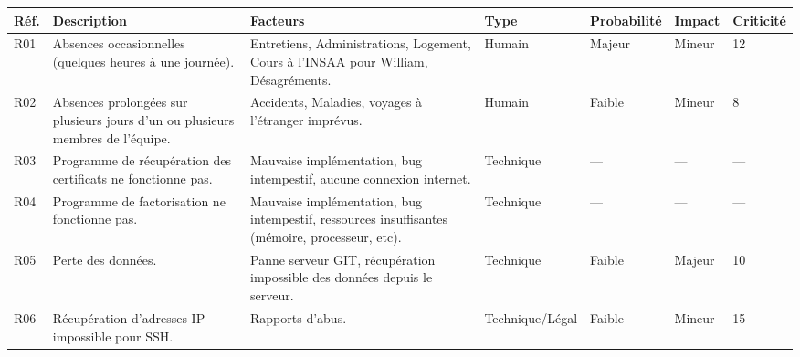 \documentclass[a4paper,11pt,french]{article}
\begin{document}
\begin{center}
\begin{tabular}{|l|p{4cm}|p{4cm}|l|l|l|l|}
\hline
\textbf{Réf.} & \textbf{Description} & \textbf{Facteurs} & \textbf{Type} & \textbf{Probabilité} & \textbf{Impact} & \textbf{Criticité} \\
\hline
 \hline
 R01 & Absences occasionnelles (quelques heures à une journée). &
 Entretiens, Administrations, Logement, Cours à l'INSAA pour William, Désagréments. &
 Humain &
 Majeur &
 Mineur &
 12 \\
 \hline
 R02 & Absences prolongées sur plusieurs jours d'un ou plusieurs membres de l'équipe. &
 Accidents, Maladies, voyages à l'étranger imprévus. &
 Humain &
 Faible &
 Mineur &
 8 \\
 \hline
 R03 & Programme de récupération des certificats ne fonctionne pas. &
 Mauvaise implémentation, bug intempestif, aucune connexion internet. &
 Technique &
 --- &
 --- &
 --- \\
\hline
 R04 & Programme de factorisation ne fonctionne pas. &
 Mauvaise implémentation, bug intempestif, ressources insuffisantes (mémoire, processeur, etc). &
 Technique &
 --- &
 --- &
 --- \\
\hline
 R05 & Perte des données. &
 Panne serveur GIT, récupération impossible des données depuis le serveur. &
 Technique &
 Faible &
 Majeur &
 10 \\
\hline
 R06 & Récupération d'adresses IP impossible pour SSH. &
 Rapports d'abus. &
 Technique/Légal &
 Faible &
 Mineur &
 15 \\
\hline

\end{tabular}
\end{center}
\end{document}
